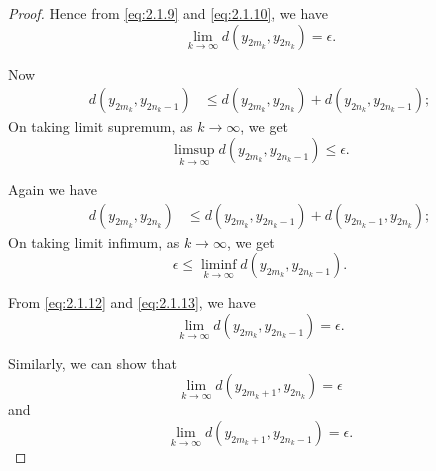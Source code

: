 \documentclass[11]{article}
\numberwithin{equation}{section}
\begin{document}
\begin{proof}
Hence from \eqref{eq:2.1.9} and \eqref{eq:2.1.10}, we have
\begin{equation}\label{eq:2.1.11}
\lim_{k\to\infty} d(y_{2m_k}, y_{2n_k}) = \epsilon.
\end{equation}

Now
\begin{align*}
d(y_{2m_k}, y_{2n_k-1}) &\leq d(y_{2m_k}, y_{2n_k}) + d(y_{2n_k}, y_{2n_k-1});
\end{align*}
On taking limit supremum, as $k \to \infty$, we get
\begin{equation}\label{eq:2.1.12}
\limsup_{k\to\infty} d(y_{2m_k}, y_{2n_k-1}) \leq \epsilon.
\end{equation}

Again we have
\begin{align*}
d(y_{2m_k}, y_{2n_k}) &\leq d(y_{2m_k}, y_{2n_k-1}) + d(y_{2n_k-1}, y_{2n_k});
\end{align*}
On taking limit infimum, as $k \to \infty$, we get
\begin{equation}\label{eq:2.1.13}
\epsilon \leq \liminf_{k\to\infty} d(y_{2m_k}, y_{2n_k-1}).
\end{equation}

From \eqref{eq:2.1.12} and \eqref{eq:2.1.13}, we have
\begin{equation}\label{eq:2.1.14}
\lim_{k\to\infty} d(y_{2m_k}, y_{2n_k-1}) = \epsilon.
\end{equation}

Similarly, we can show that
\begin{equation}\label{eq:2.1.15}
\lim_{k\to\infty} d(y_{2m_k+1}, y_{2n_k}) = \epsilon
\end{equation}
and
\begin{equation}\label{eq:2.1.16}
\lim_{k\to\infty} d(y_{2m_k+1}, y_{2n_k-1}) = \epsilon.
\end{equation}


\end{proof}
\end{document}
